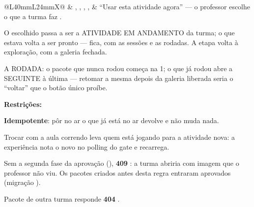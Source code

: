\begin{tabularx}{\linewidth}{@{}L{40mm}L{24mm}X@{}}
 & , , , ,  & \enquote{Usar esta atividade agora} --- o professor escolhe o que a turma faz .\par O escolhido passa a ser a ATIVIDADE EM ANDAMENTO da turma; o que estava volta a ser pronto --- fica, com as sessões e as rodadas. A etapa volta à exploração, com a galeria fechada.\par A RODADA: o pacote que nunca rodou começa na 1; o que já rodou abre a SEGUINTE à última --- retomar a mesma depois da galeria liberada seria o \enquote{voltar} que o botão único proíbe.\par \textbf{Restrições:}\par \hspace*{1em}\textbullet{} \textbf{Idempotente}: pôr no ar o que já está no ar devolve  e não muda nada.\par \hspace*{1em}\textbullet{} Trocar com a aula correndo leva quem está jogando para a atividade nova: a experiência nota o  novo no polling do gate e recarrega.\par \hspace*{1em}\textbullet{} Sem a segunda fase da aprovação (), \textbf{409} : a turma abriria com imagem que o professor não viu. Os pacotes criados antes desta regra entraram aprovados (migração ).\par \hspace*{1em}\textbullet{} Pacote de outra turma responde \textbf{404} .\\

\end{tabularx}
